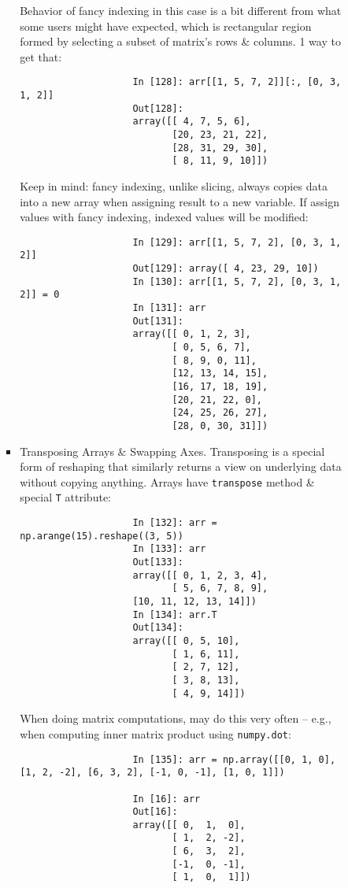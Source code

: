\documentclass{article}
\begin{document}
\begin{enumerate}
\begin{itemize}
\begin{itemize}
\begin{itemize}
				Behavior of fancy indexing in this case is a bit different from what some users might have expected, which is rectangular region formed by selecting a subset of matrix's rows \& columns. 1 way to get that:
				\begin{verbatim}
					In [128]: arr[[1, 5, 7, 2]][:, [0, 3, 1, 2]]
					Out[128]:
					array([[ 4, 7, 5, 6],
					       [20, 23, 21, 22],
					       [28, 31, 29, 30],
					       [ 8, 11, 9, 10]])
				\end{verbatim}
				Keep in mind: fancy indexing, unlike slicing, always copies data into a new array when assigning result to a new variable. If assign values with fancy indexing, indexed values will be modified:
				\begin{verbatim}
					In [129]: arr[[1, 5, 7, 2], [0, 3, 1, 2]]
					Out[129]: array([ 4, 23, 29, 10])
					In [130]: arr[[1, 5, 7, 2], [0, 3, 1, 2]] = 0
					In [131]: arr
					Out[131]:
					array([[ 0, 1, 2, 3],
					       [ 0, 5, 6, 7],
					       [ 8, 9, 0, 11],
					       [12, 13, 14, 15],
					       [16, 17, 18, 19],
					       [20, 21, 22, 0],
					       [24, 25, 26, 27],
					       [28, 0, 30, 31]])
				\end{verbatim}
				\item {\sf Transposing Arrays \& Swapping Axes.} Transposing is a special form of reshaping that similarly returns a view on underlying data without copying anything. Arrays have {\tt transpose} method \& special {\tt T} attribute:
				\begin{verbatim}
					In [132]: arr = np.arange(15).reshape((3, 5))
					In [133]: arr
					Out[133]:
					array([[ 0, 1, 2, 3, 4],
					       [ 5, 6, 7, 8, 9],
					[10, 11, 12, 13, 14]])
					In [134]: arr.T
					Out[134]:
					array([[ 0, 5, 10],
					       [ 1, 6, 11],
					       [ 2, 7, 12],
					       [ 3, 8, 13],
					       [ 4, 9, 14]])
				\end{verbatim}
				When doing matrix computations, may do this very often -- e.g., when computing inner matrix product using {\tt numpy.dot}:
				\begin{verbatim}
					In [135]: arr = np.array([[0, 1, 0], [1, 2, -2], [6, 3, 2], [-1, 0, -1], [1, 0, 1]])
					
					In [16]: arr
					Out[16]: 
					array([[ 0,  1,  0],
					       [ 1,  2, -2],
					       [ 6,  3,  2],
					       [-1,  0, -1],
					       [ 1,  0,  1]])
					

\end{verbatim}
\end{itemize}
\end{itemize}
\end{itemize}
\end{enumerate}
\end{document}
